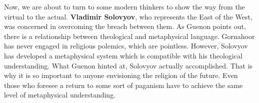 Now, we are about to turn to some modern thinkers to show the way from the virtual to the actual. \textbf{Vladimir Solovyov}, who represents the East of the West, was concerned in overcoming the breach between them. As Guenon points out, there is a relationship between theological and metaphysical language. Gornahoor has never engaged in religious polemics, which are pointless. However, Solovyov has developed a metaphysical system which is compatible with his theological understanding. What Guenon hinted at, Solovyov actually accomplished. That is why it is so important to anyone envisioning the religion of the future. Even those who foresee a return to some sort of paganism have to achieve the same level of metaphysical understanding.

